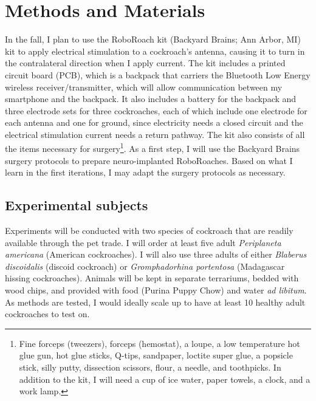 \section{Methods and Materials}
\label{sec:methods}

In the fall, I plan to use the RoboRoach kit (Backyard Brains; Ann Arbor, MI) kit to apply electrical stimulation to a cockroach's antenna, causing it to turn in the contralateral direction when I apply current. The kit includes a printed circuit board (PCB), which is a backpack that carriers the Bluetooth Low Energy wireless receiver/transmitter, which will allow communication between my smartphone and the backpack. It also includes a battery for the backpack and three electrode sets for three cockroaches, each of which include one electrode for each antenna and one for ground, since electricity needs a closed circuit and the electrical stimulation current needs a return pathway. The kit also consists of all the items necessary for surgery\footnote{Fine forceps (tweezers), forceps (hemostat), a loupe, a low temperature hot glue gun, hot glue sticks, Q-tips, sandpaper, loctite super glue, a popsicle stick, silly putty, dissection scissors, flour, a needle, and toothpicks. In addition to the kit, I will need a cup of ice water, paper towels, a clock, and a work lamp.}. As a first step, I will use the Backyard Brains surgery protocols to prepare neuro-implanted RoboRoaches. Based on what I learn in the first iterations, I may adapt the surgery protocols as necessary. 





\subsection{Experimental subjects}
Experiments will be conducted with two species of cockroach that are readily available through the pet trade. I will order at least five adult \emph{Periplaneta americana} (American cockroaches). I will also use three adults of either \emph{Blaberus discoidalis} (discoid cockroach) or \emph{Gromphadorhina portentosa} (Madagascar hissing cockroaches). Animals will be kept in separate terrariums, bedded with wood chips, and provided with food (Purina Puppy Chow) and water \emph{ad libitum}. As methods are tested, I would ideally scale up to have at least 10 healthy adult cockroaches to test on. 




